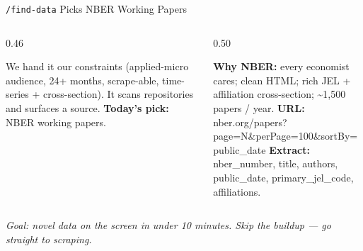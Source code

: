 \documentclass[aspectratio=169, 10pt]{beamer}
\begin{document}
\begin{frame}{\texttt{/find-data} Picks NBER Working Papers}
\begin{columns}[T]
\begin{column}{0.46\textwidth}
\begin{tcolorbox}[keybox, title={\faSearch\quad \texttt{/find-data} in one line}]
\scriptsize
We hand it our constraints (applied-micro audience, 24+ months, scrape-able, time-series + cross-section). It scans repositories and surfaces a source.
\vskip3pt
\textbf{Today's pick:} NBER working papers.
\end{tcolorbox}
\end{column}
\begin{column}{0.50\textwidth}
\begin{tcolorbox}[accentbox]
\scriptsize
\textbf{Why NBER:} every economist cares; clean HTML; rich JEL + affiliation cross-section; \textasciitilde 1{,}500 papers / year.
\vskip3pt
\textbf{URL:}\\
{\tiny\ttfamily nber.org/papers?page=N\&perPage=100\&sortBy=public\_date}
\vskip3pt
\textbf{Extract:} {\fontsize{6.5}{8}\selectfont\ttfamily nber\_number, title, authors, public\_date, primary\_jel\_code, affiliations.}
\end{tcolorbox}
\end{column}
\end{columns}
\vskip4pt
\begin{center}
{\scriptsize\color{CoolGray}\textit{Goal: novel data on the screen in under 10 minutes. Skip the buildup --- go straight to scraping.}}
\end{center}
\end{frame}
\end{document}
